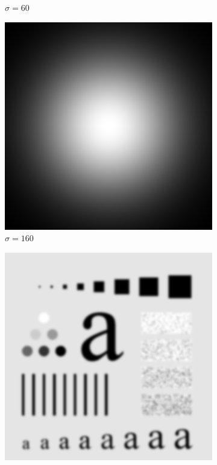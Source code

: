 \documentclass[
	12pt, %
]{style/fphw}
\begin{document}
\begin{figure}[H]
\begin{subfigure}[b]{.3\textwidth}
         \caption{$\sigma=60$}
         \label{Q5_2_lowpass_filter_60}
     \end{subfigure}
     \hfill
     \begin{subfigure}[b]{.3\textwidth}
         \centering
         \includegraphics[width=\textwidth]{Q5_2_lowpass_filter_160.png}
         \caption{$\sigma=160$}
         \label{Q5_2_lowpass_filter_160}
     \end{subfigure}
     \vfill
     \begin{subfigure}[b]{.3\textwidth}
         \centering
         \includegraphics[width=\textwidth]{Q5_2_lowpass_30.png}

\end{subfigure}
\end{figure}
\end{document}
